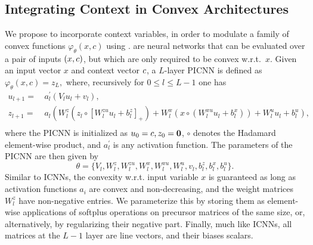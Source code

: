 \subsection{Integrating Context in Convex Architectures}
We propose to incorporate context variables, in order to modulate a family of convex functions $\varphi_{\theta}(x, c)$
using .  are neural networks that can be evaluated over a pair of inputs $(x,c)$, but which are only required to be convex w.r.t.~$x$. Given an input vector $x$ and context vector $c$, a ${L}$-layer PICNN is defined as $\varphi_\theta(x, c) = z_{L},$ where, recursively for $0 \leq {l} \leq {L}-1$ one has
\begin{equation} \label{eq:picnn}
\begin{aligned} 
u_{{l}+1} =&\, a^\prime_{l}\left(V_{l} u_{l}+v_{l}\right), \\
z_{{l}+1} =&\, a_{l}\left(W_{l}^{z}\left(z_{l} \circ\left[W_{l}^{z u} u_{l}+b_{l}^{z}\right]_+\right)+\right.
\left.W_{l}^{x}\left(x \circ(W_{l}^{x u} u_{l}+b_{l}^{x})\right)+W_{l}^{u} u_{l}+b_{l}^u\right), \\
\end{aligned}
\end{equation}
where the PICNN is initialized as $u_{0}=c, z_0 = \mathbf{0}$, $\circ$ denotes the Hadamard element-wise product, and $a^\prime_{l}$ is any activation function. The parameters of the PICNN are then given by
$$\theta = \{ V_{l}, W_{l}^{z}, W_{l}^{z u}, W_{l}^{x}, W_{l}^{x u} , W_{l}^{u}, v_{l}, b_{l}^{z}, b_{l}^{x}, b_{l}^u \}.$$ 
Similar to ICNNs, the convexity w.r.t. input variable $x$ is guaranteed as long as activation functions $a_i$ are convex and non-decreasing, and the weight matrices $W_{l}^{z}$ have non-negative entries. We parameterize this by storing them as element-wise applications of softplus operations on precursor matrices of the same size, or, alternatively, by regularizing their negative part. Finally, much like ICNNs, all matrices at the ${L}-1$ layer are line vectors, and their biases scalars.

